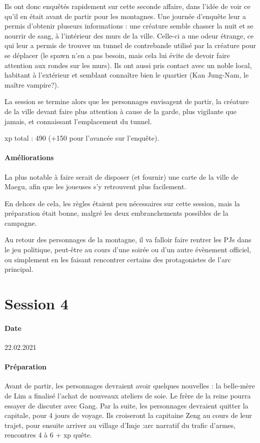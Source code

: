 \documentclass[10pt,a4paper]{book}
\begin{document}
Ils ont donc enquêtés rapidement sur cette seconde affaire, dans l'idée de voir ce qu'il en était avant de partir pour les montagnes. Une journée d'enquête leur a permis d'obtenir pluseurs informations : une créature semble chasser la nuit et se nourrir de sang, à l'intérieur des murs de la ville. Celle-ci a une odeur étrange, ce qui leur a permis de trouver un tunnel de contrebande utilisé par la créature pour se déplacer (le spawn n'en a pas besoin, mais cela lui évite de devoir faire attention aux rondes sur les murs). Ils ont aussi pris contact avec un noble local, habitant à l'extérieur et semblant connaître bien le quartier (Kan Jung-Nam, le maître vampire?).

La session se termine alors que les personnages envisagent de partir, la créature de la ville devant faire plus attention à cause de la garde, plus vigilante que jamais, et connaissant l'emplacement du tunnel.

xp total : 490 (+150 pour l'avancée sur l'enquête).
\paragraph{Améliorations}
La plus notable à faire serait de disposer (et fournir) une carte de la ville de Maegu, afin que les joueuses s'y retrouvent plus facilement.

En dehors de cela, les règles étaient peu nécessaires sur cette session, mais la préparation était bonne, malgré les deux embranchements possibles de la campagne.

Au retour des personnages de la montagne, il va falloir faire rentrer les PJs dans le jeu politique, peut-être au cours d'une soirée ou d'un autre évènement officiel, ou simplement en les faisant rencontrer certains des protagonistes de l'arc principal.
\section{Session 4}
\paragraph{Date}22.02.2021
\paragraph{Préparation} Avant de partir, les personnages devraient avoir quelques nouvelles : la belle-mère de Lim a finalisé l'achat de nouveaux ateliers de soie. Le frère de la reine pourra essayer de discuter avec Gang. Par la suite, les personnages devraient quitter la capitale, pour 4 jours de voyage. Ils croiseront la capitaine Zeng au cours de leur trajet, pour ensuite arriver au village d'Imje :arc narratif du trafic d'armes, rencontres 4 à 6 + xp quête.
\end{document}
